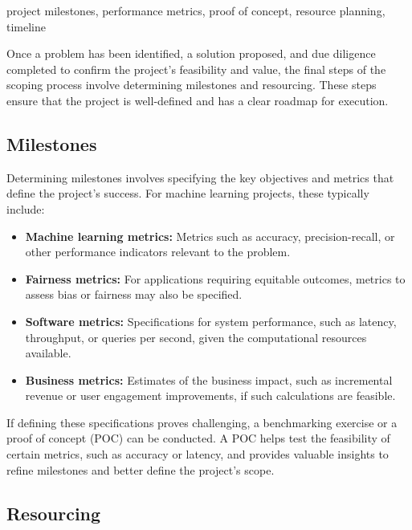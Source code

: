 \documentclass[12pt,openany]{book}
\begin{document}
\begin{keywordsbox}
project milestones, performance metrics, proof of concept, resource planning, timeline
\end{keywordsbox}


Once a problem has been identified, a solution proposed, and due diligence completed to confirm the project's feasibility and value, the final steps of the scoping process involve determining milestones and resourcing. These steps ensure that the project is well-defined and has a clear roadmap for execution.

\subsection{Milestones}

Determining milestones involves specifying the key objectives and metrics that define the project's success. For machine learning projects, these typically include:
\begin{itemize}
    \item \textbf{Machine learning metrics:} Metrics such as accuracy, precision-recall, or other performance indicators relevant to the problem.
    \item \textbf{Fairness metrics:} For applications requiring equitable outcomes, metrics to assess bias or fairness may also be specified.
    \item \textbf{Software metrics:} Specifications for system performance, such as latency, throughput, or queries per second, given the computational resources available.
    \item \textbf{Business metrics:} Estimates of the business impact, such as incremental revenue or user engagement improvements, if such calculations are feasible.
\end{itemize}

If defining these specifications proves challenging, a benchmarking exercise or a proof of concept (POC) can be conducted. A POC helps test the feasibility of certain metrics, such as accuracy or latency, and provides valuable insights to refine milestones and better define the project's scope.

\subsection{Resourcing}
\end{document}
